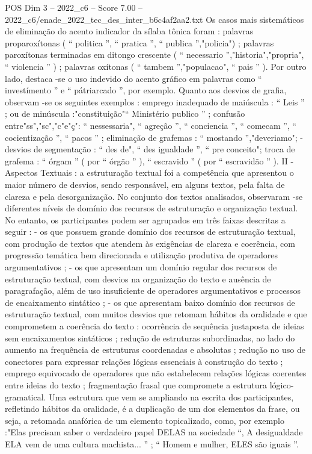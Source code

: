 \begin{textsample}{POS Dim 3 – 2022\_c6 – Score 7.00 – 2022\_c6/enade\_2022\_tec\_des\_inter\_b6c4af2aa2.txt}
Os casos mais sistemáticos de eliminação do acento indicador da sílaba tônica foram : palavras proparoxítonas ( “ politica ”, “ pratica ”, “ publica ”,"policia") ; palavras paroxítonas terminadas em ditongo crescente ( “ necessario ”,"historia","propria", “ violencia ” ) ; palavras oxítonas ( “ tambem ”,"populacao", “ pais ” ).
Por outro lado, destaca -se o uso indevido do acento gráfico em palavras como “ investímento ” e “ pátriarcado ”, por exemplo.
Quanto aos desvios de grafia, observam -se os seguintes exemplos : emprego inadequado de maiúscula : “ Leis ” ; ou de minúscula :"constituição"“ Ministério publico ” ; confusão entre"ss","sc","c"e"ç": “ nessessaria", “ agreção ”, “ conciencia ”, “ comecam ”, “ cocientização ”, “ pacos ” ; eliminação de grafemas : “ mostando ”,"deveriamo"; - desvios de segmentação : “ des de", “ des igualdade ”, “ pre conceito"; troca de grafema : “ órgam ” ( por “ órgão ” ), “ escravido ” ( por “ escravidão ” ).
II - Aspectos Textuais : a estruturação textual foi a competência que apresentou o maior número de desvios, sendo responsável, em alguns textos, pela falta de clareza e pela desorganização.
No conjunto dos textos analisados, observaram -se diferentes níveis de domínio dos recursos de estruturação e organização textual.
No entanto, os participantes podem ser agrupados em três faixas descritas a seguir : - os que possuem grande domínio dos recursos de estruturação textual, com produção de textos que atendem às exigências de clareza e coerência, com progressão temática bem direcionada e utilização produtiva de operadores argumentativos ; - os que apresentam um domínio regular dos recursos de estruturação textual, com desvios na organização do texto e ausência de paragrafação, além de uso insuficiente de operadores argumentativos e processos de encaixamento sintático ; - os que apresentam baixo domínio dos recursos de estruturação textual, com muitos desvios que retomam hábitos da oralidade e que comprometem a coerência do texto : ocorrência de sequência justaposta de ideias sem encaixamentos sintáticos ; redução de estruturas subordinadas, ao lado do aumento na frequência de estruturas coordenadas e absolutas ; redução no uso de conectores para expressar relações lógicas essenciais à construção do texto ; emprego equivocado de operadores que não estabelecem relações lógicas coerentes entre ideias do texto ; fragmentação frasal que compromete a estrutura lógico-gramatical.
Uma estrutura que vem se ampliando na escrita dos participantes, refletindo hábitos da oralidade, é a duplicação de um dos elementos da frase, ou seja, a retomada anafórica de um elemento topicalizado, como, por exemplo :"Elas precisam saber o verdadeiro papel DELAS na sociedade “, A desigualdade ELA vem de uma cultura machista... ” ; “ Homem e mulher, ELES são iguais ”.

\end{textsample}
